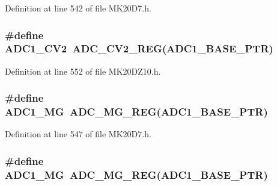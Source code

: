 Definition at line 542 of file M\+K20\+D7.\+h.

\subsubsection[{\texorpdfstring{A\+D\+C1\+\_\+\+C\+V2}{ADC1_CV2}}]{\setlength{\rightskip}{0pt plus 5cm}\#define A\+D\+C1\+\_\+\+C\+V2~{\bf A\+D\+C\+\_\+\+C\+V2\+\_\+\+R\+EG}({\bf A\+D\+C1\+\_\+\+B\+A\+S\+E\+\_\+\+P\+TR})}\hypertarget{group___a_d_c___register___accessor___macros_gabdfdeb322df796f7476878fd3aad8e53}{}\label{group___a_d_c___register___accessor___macros_gabdfdeb322df796f7476878fd3aad8e53}


Definition at line 552 of file M\+K20\+D\+Z10.\+h.

\subsubsection[{\texorpdfstring{A\+D\+C1\+\_\+\+MG}{ADC1_MG}}]{\setlength{\rightskip}{0pt plus 5cm}\#define A\+D\+C1\+\_\+\+MG~{\bf A\+D\+C\+\_\+\+M\+G\+\_\+\+R\+EG}({\bf A\+D\+C1\+\_\+\+B\+A\+S\+E\+\_\+\+P\+TR})}\hypertarget{group___a_d_c___register___accessor___macros_ga96f53fc22e1488ac9acdbfb9f291dcff}{}\label{group___a_d_c___register___accessor___macros_ga96f53fc22e1488ac9acdbfb9f291dcff}


Definition at line 547 of file M\+K20\+D7.\+h.

\subsubsection[{\texorpdfstring{A\+D\+C1\+\_\+\+MG}{ADC1_MG}}]{\setlength{\rightskip}{0pt plus 5cm}\#define A\+D\+C1\+\_\+\+MG~{\bf A\+D\+C\+\_\+\+M\+G\+\_\+\+R\+EG}({\bf A\+D\+C1\+\_\+\+B\+A\+S\+E\+\_\+\+P\+TR})}\hypertarget{group___a_d_c___register___accessor___macros_ga96f53fc22e1488ac9acdbfb9f291dcff}{}\label{group___a_d_c___register___accessor___macros_ga96f53fc22e1488ac9acdbfb9f291dcff}


